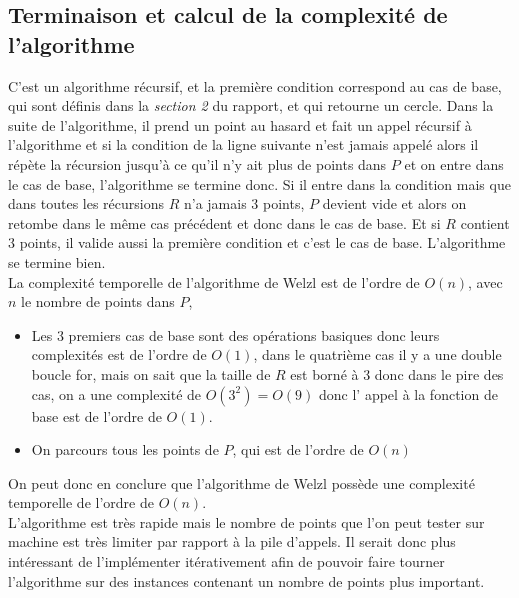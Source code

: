 \documentclass[12pt, a4paper, titlepage]{article}
\begin{document}
    \subsection{Terminaison et calcul de la complexité de l'algorithme}
        C'est un algorithme récursif, et la première condition correspond au cas de base, qui sont définis dans la \textit{section 2} du rapport, et qui retourne un cercle. Dans la suite de l'algorithme, il prend un point au hasard et fait un appel récursif à l'algorithme et si la condition de la ligne suivante n'est jamais appelé alors il répète la récursion jusqu'à ce qu'il n'y ait plus de points dans $P$ et on entre dans le cas de base, l'algorithme se termine donc. Si il entre dans la condition mais que dans toutes les récursions $R$ n'a jamais 3 points, $P$ devient vide et alors on retombe dans le même cas précédent et donc dans le cas de base. Et si $R$ contient 3 points, il valide aussi la première condition et c'est le cas de base. L'algorithme se termine bien.\\
        La complexité temporelle de l'algorithme de Welzl est de l'ordre de $O(n)$, avec $n$ le nombre de points dans $P$,
        \begin{itemize}
            \item Les 3 premiers cas de base sont des opérations basiques donc leurs complexités est de l'ordre de $O(1)$, dans le quatrième cas il y a une double boucle for, mais on sait que la taille de $R$ est borné à 3 donc dans le pire des cas, on a une complexité de $O(3^{2})= O(9)$ donc l' appel à la fonction de base est de l'ordre de $O(1)$. 
            \item On parcours tous les points de $P$, qui est de l'ordre de $O(n)$
        \end{itemize}
        On peut donc en conclure que l'algorithme de Welzl possède une complexité temporelle de l'ordre de $O(n)$.\\
        L'algorithme est très rapide mais le nombre de points que l'on peut tester sur machine est très limiter par rapport à la pile d'appels. Il serait donc plus intéressant de l'implémenter itérativement afin de pouvoir faire tourner l'algorithme sur des instances contenant un nombre de points plus important. 
    
\end{document}
